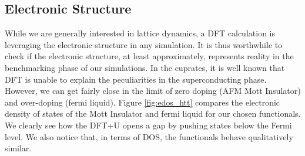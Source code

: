 
\subsection{Electronic Structure}
While we are generally interested in lattice dynamics, a DFT calculation is leveraging the electronic structure in any simulation. It is thus worthwhile to check if the electronic structure, at least approximately, represents reality in the benchmarking phase of our simulations. In the cuprates, it is well known that DFT is unable to explain the peculiarities in the superconducting phase. However, we can get fairly close in the limit of zero doping (AFM Mott Insulator) and over-doping (fermi liquid). Figure \ref{fig:edos_htt} compares the electronic density of states of the Mott Insulator and fermi liquid for our chosen functionals. We clearly see how the DFT+U opens a gap by pushing states below the Fermi level. We also notice that, in terms of DOS, the functionals behave qualitatively similar.  

